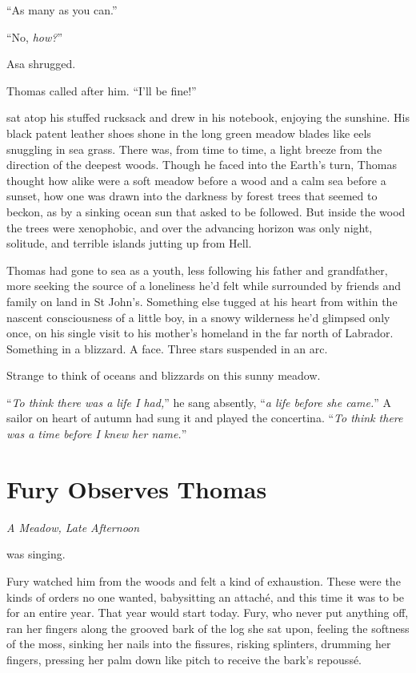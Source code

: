 \documentclass[11pt,a5paper]{article}
\newcommand{\alet}[1]{\textit{#1}\vspace{1em}}
\begin{document}
``As many as you can.''

``No, \emph{how?}''

Asa shrugged.

Thomas called after him. ``I'll be fine!''

\vspace{1em}

 sat atop his stuffed rucksack and drew in his notebook, enjoying the sunshine. His black patent leather shoes shone in the long green meadow blades like eels snuggling in sea grass. There was, from time to time, a light breeze from the direction of the deepest woods. Though he faced into the Earth's turn, Thomas thought how alike were a soft meadow before a wood and a calm sea before a sunset, how one was drawn into the darkness by forest trees that seemed to beckon, as by a sinking ocean sun that asked to be followed. But inside the wood the trees were xenophobic, and over the advancing horizon was only night, solitude, and terrible islands jutting up from Hell.

Thomas had gone to sea as a youth, less following his father and grandfather, more seeking the source of a loneliness he'd felt while surrounded by friends and family on land in St John's. Something else tugged at his heart from within the nascent consciousness of a little boy, in a snowy wilderness he'd glimpsed only once, on his single visit to his mother's homeland in the far north of Labrador. Something in a blizzard. A face. Three stars suspended in an arc.

Strange to think of oceans and blizzards on this sunny meadow.

``\emph{To think there was a life I had,}'' he sang absently, ``\emph{a life before she came.}'' A sailor on {\sc heart of autumn} had sung it and played the concertina. ``\emph{To think there was a time before I knew her name.}''

\newpage

\section{Fury Observes Thomas}

\alet{A Meadow, Late Afternoon}

 was singing.

Fury watched him from the woods and felt a kind of exhaustion. These were the kinds of orders no one wanted, babysitting an attaché, and this time it was to be for an entire year. That year would start today. Fury, who never put anything off, ran her fingers along the grooved bark of the log she sat upon, feeling the softness of the moss, sinking her nails into the fissures, risking splinters, drumming her fingers, pressing her palm down like pitch to receive the bark's repoussé.
\end{document}
